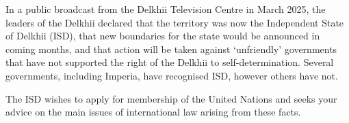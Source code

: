 \begin{tutorialquestion}
    In a public broadcast from the Delkhii Television Centre in March 2025, the leaders of the Delkhii declared that the territory was now the Independent State of Delkhii (ISD), that new boundaries for the state would be announced in coming months, and that action will be taken against `unfriendly' governments that have not supported the right of the Delkhii to self-determination. Several governments, including Imperia, have recognised ISD, however others have not.

    \vspace{\baselineskip}

    The ISD wishes to apply for membership of the United Nations and seeks your advice on the main issues of international law arising from these facts.
    
\end{tutorialquestion}

